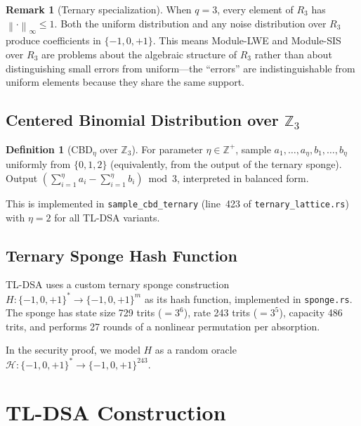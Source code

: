 \documentclass[11pt,a4paper]{article}
\theoremstyle{definition}
\newtheorem{definition}[theorem]{Definition}
\newtheorem{remark}[theorem]{Remark}
\newcommand{\Z}{\mathbb{Z}}
\newcommand{\linf}[1]{\left\lVert #1 \right\rVert_{\infty}}
\begin{document}
\begin{remark}[Ternary specialization]
When $q = 3$, every element of $R_3$ has $\linf{\cdot} \leq 1$. Both the uniform distribution and any noise distribution over $R_3$ produce coefficients in $\{-1, 0, +1\}$. This means Module-LWE and Module-SIS over $R_3$ are problems about the algebraic structure of $R_3$ rather than about distinguishing small errors from uniform---the ``errors'' are indistinguishable from uniform elements because they share the same support.
\end{remark}

\subsection{Centered Binomial Distribution over $\Z_3$}

\begin{definition}[CBD$_\eta$ over $\Z_3$]
\label{def:cbd}
For parameter $\eta \in \Z^+$, sample $a_1, \ldots, a_\eta, b_1, \ldots, b_\eta$ uniformly from $\{0, 1, 2\}$ (equivalently, from the output of the ternary sponge). Output $\left(\sum_{i=1}^\eta a_i - \sum_{i=1}^\eta b_i\right) \bmod 3$, interpreted in balanced form.
\end{definition}

This is implemented in \texttt{sample\_cbd\_ternary} (line~423 of \texttt{ternary\_lattice.rs}) with $\eta = 2$ for all TL-DSA variants.

\subsection{Ternary Sponge Hash Function}

TL-DSA uses a custom ternary sponge construction $H: \{-1,0,+1\}^* \to \{-1,0,+1\}^m$ as its hash function, implemented in \texttt{sponge.rs}. The sponge has state size 729 trits ($= 3^6$), rate 243 trits ($= 3^5$), capacity 486 trits, and performs 27 rounds of a nonlinear permutation per absorption.

In the security proof, we model $H$ as a random oracle $\mathcal{H}: \{-1,0,+1\}^* \to \{-1,0,+1\}^{243}$.

\section{TL-DSA Construction}
\label{sec:construction}
\end{document}

